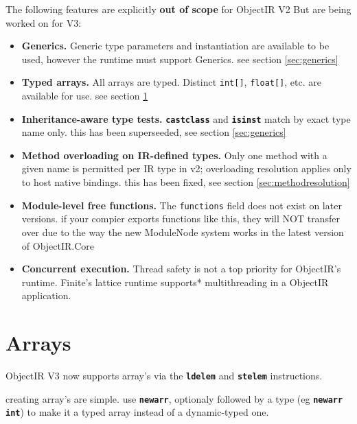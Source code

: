 \documentclass[11pt,a4paper]{article}
\newcommand{\opcode}[1]{\textbf{\texttt{#1}}}
\begin{document}
The following features are explicitly \textbf{out of scope} for ObjectIR V2
But are being worked on for V3:

\begin{itemize}[leftmargin=1.8em]
  \item \textbf{Generics.} Generic type parameters and instantiation are
  available to be used, however the runtime must support Generics. 
  see section \ref{sec:generics}
    
  \item \textbf{Typed arrays.} All arrays are typed. Distinct
    \texttt{int[]}, \texttt{float[]}, etc. are available for use. 
    see section \ref{sec:arrays}
  
  \item \textbf{Inheritance-aware type tests.} \opcode{castclass} and
    \opcode{isinst} match by exact type name only.
    this has been superseeded, see section \ref{sec:generics}
    
  \item \textbf{Method overloading on IR-defined types.} Only one method
    with a given name is permitted per IR type in v2; overloading resolution
    applies only to host native bindings.
    this has been fixed, see section \ref{sec:methodresolution}

  \item \textbf{Module-level free functions.} The \texttt{functions} field does not exist on later versions.
  if your compier exports functions like this, they will NOT transfer over due to 
  the way the new ModuleNode system works in the latest version of ObjectIR.Core
  
  \item \textbf{Concurrent execution.} Thread safety is not a top priority for ObjectIR's runtime.
  Finite's lattice runtime supports* multithreading in a ObjectIR application.
\end{itemize}

\appendix


\section{Arrays}
\label{sec:arrays}
ObjectIR V3 now supports array's via the \opcode{ldelem} and \opcode{stelem} instructions.

creating array's are simple.
use \opcode{newarr}, optionaly followed by a type (eg \opcode{newarr int}) to make it a typed array instead of a dynamic-typed one.
\end{document}

